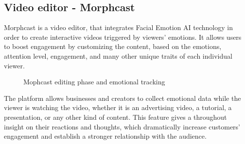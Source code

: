 \documentclass[12pt,a4paper,oneside,english]{book}
\begin{document}
\subsection{Video editor - Morphcast}
Morphcast is a video editor, that integrates Facial Emotion AI technology in order to create interactive videos triggered by viewers' emotions. It allows users to boost engagement by customizing the content, based on the emotions, attention level, engagement, and many other unique traits of each individual viewer.
\begin{figure}[H]
\begin{center}
\quad 
{}
\caption{Mophcast editing phase and emotional tracking}
\label{fig:morphcast}
\cite{morphcast}
\end{center}
\end{figure}


\noindent
  The platform allows businesses and creators to collect emotional data while the viewer is watching the video, whether it is an advertising video, a tutorial, a presentation, or any other kind of content. This feature gives a throughout insight on their reactions and thoughts, which dramatically increase customers’ engagement and establish a stronger relationship with the audience.
\end{document}
